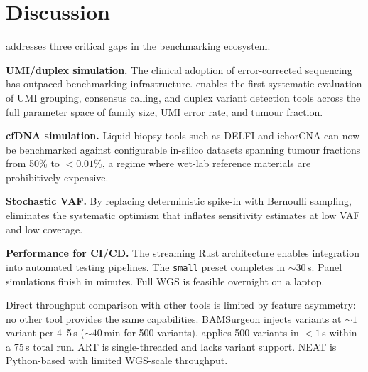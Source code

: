 \section{Discussion}
\label{sec:discussion}

\varforge{} addresses three critical gaps in the benchmarking ecosystem.

\textbf{UMI/duplex simulation.}
The clinical adoption of error-corrected sequencing has outpaced benchmarking infrastructure.
\varforge{} enables the first systematic evaluation of UMI grouping, consensus calling, and duplex variant detection tools across the full parameter space of family size, UMI error rate, and tumour fraction.

\textbf{cfDNA simulation.}
Liquid biopsy tools such as DELFI and ichorCNA can now be benchmarked against configurable in-silico datasets spanning tumour fractions from 50\% to $<0.01\%$, a regime where wet-lab reference materials are prohibitively expensive.

\textbf{Stochastic VAF.}
By replacing deterministic spike-in with Bernoulli sampling, \varforge{} eliminates the systematic optimism that inflates sensitivity estimates at low VAF and low coverage.

\textbf{Performance for CI/CD.}
The streaming Rust architecture enables integration into automated testing pipelines.
The \texttt{small} preset completes in ${\sim}30$\,s.
Panel simulations finish in minutes.
Full WGS is feasible overnight on a laptop.

Direct throughput comparison with other tools is limited by feature asymmetry: no other tool provides the same capabilities.
BAMSurgeon injects variants at ${\sim}1$ variant per 4--5\,s (${\sim}40$\,min for 500 variants).
\varforge{} applies 500 variants in $<1$\,s within a 75\,s total run.
ART is single-threaded and lacks variant support.
NEAT is Python-based with limited WGS-scale throughput.
